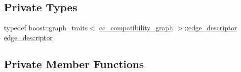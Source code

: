 \subsection*{Private Types}
\begin{DoxyCompactItemize}
\item 
typedef boost\+::graph\+\_\+traits$<$ \hyperlink{clique__covering__graph_8hpp_aa88e9419fe776ef37020cacd507cc4ad}{cc\+\_\+compatibility\+\_\+graph} $>$\+::\hyperlink{classTS__based__clique__covering_ab89e23e8ad01980e2ea3ac0d796db907}{edge\+\_\+descriptor} \hyperlink{classTS__based__clique__covering_ab89e23e8ad01980e2ea3ac0d796db907}{edge\+\_\+descriptor}
\end{DoxyCompactItemize}
\subsection*{Private Member Functions}

